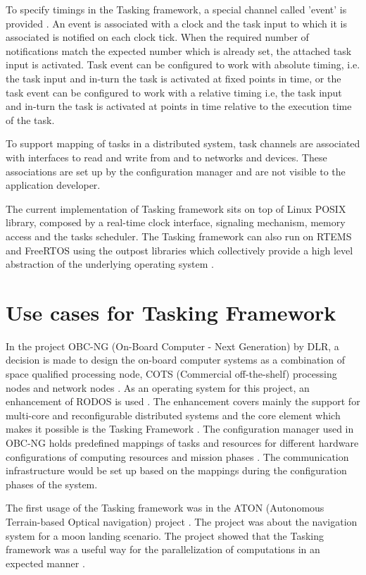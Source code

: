 To specify timings in the Tasking framework, a special channel called 'event' is provided \cite{TaskFr}. An event is associated with a clock and the task input to which it is associated is notified on each clock tick. When the required number of notifications match the expected number which is already set, the attached task input is activated. Task event can be configured to work with absolute timing, i.e. the task input and in-turn the task is activated at fixed points in time, or the task event can be configured to work with a relative timing i.e, the task input and in-turn the task is activated at points in time relative to the execution time of the task.

To support mapping of tasks in a distributed system, task channels are associated with interfaces to read and write from and to networks and devices. These associations are set up by the configuration manager and are not visible to the application developer.

The current implementation of Tasking framework sits on top of Linux POSIX library, composed by a real-time clock interface, signaling mechanism, memory access and the tasks scheduler. The Tasking framework can also run on RTEMS and FreeRTOS using the outpost libraries which collectively provide a high level abstraction of the underlying operating system \cite{TaskFr}.

\section{Use cases for Tasking Framework}
In the project OBC-NG (On-Board Computer - Next Generation) by DLR, a decision is made to design the on-board computer systems as a combination of space qualified processing node, COTS (Commercial off-the-shelf) processing nodes and network nodes \cite{TaskFr}. As an operating system for this project, an enhancement of RODOS is used \cite{TaskFr}\cite{OBC-NG}. The enhancement covers mainly the support for multi-core and reconfigurable distributed systems \cite{RODOS} and the core element which makes it possible is the Tasking Framework \cite{TaskFr}. The configuration manager used in OBC-NG holds predefined mappings of tasks and resources for different hardware configurations of computing resources and mission phases \cite{OBC-NG}. The communication infrastructure would be set up based on the mappings during the configuration phases of the system. 

The first usage of the Tasking framework was in the ATON (Autonomous Terrain-based Optical navigation) project \cite{ATON}. The project was about the navigation system for a moon landing scenario. The project showed that the Tasking framework was a useful way for the parallelization of computations in an expected manner \cite{ATON}.

